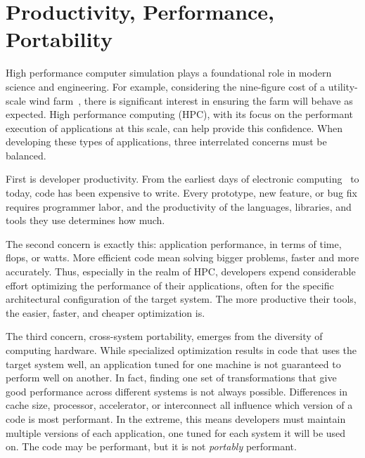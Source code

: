 \chapter{Productivity, Performance, Portability}

High performance computer simulation plays a foundational role in modern science and engineering.
For example, considering the nine-figure cost of a utility-scale wind farm~\cite{wiser2022land}, there is significant interest in ensuring the farm will behave as expected. 
High performance computing (HPC), with its focus on the performant execution of applications at this scale, can help provide this confidence.
When developing these types of applications, three interrelated concerns must be balanced. 

First is developer productivity.
From the earliest days of electronic computing~\cite{backus1957fortran} to today, code has been expensive to write.
Every prototype, new feature, or bug fix requires programmer labor, and the productivity of the languages, libraries, and tools they use determines how much.

The second concern is exactly this: application performance, in terms of time, flops, or watts.
More efficient code mean solving bigger problems, faster and more accurately.
Thus, especially in the realm of HPC, developers expend considerable effort optimizing the performance of their applications, often for the specific architectural configuration of the target system.
The more productive their tools, the easier, faster, and cheaper optimization is.

The third concern, cross-system portability, emerges from the diversity of computing hardware. 
While specialized optimization results in code that uses the target system well, an application tuned for one machine is not guaranteed to perform well on another.
In fact, finding one set of transformations that give good performance across different systems is not always possible.
Differences in cache size, processor, accelerator, or interconnect all influence which version of a code is most performant.
In the extreme, this means developers must maintain multiple versions of each application, one tuned for each system it will be used on.
The code may be performant, but it is not \textit{portably} performant.

